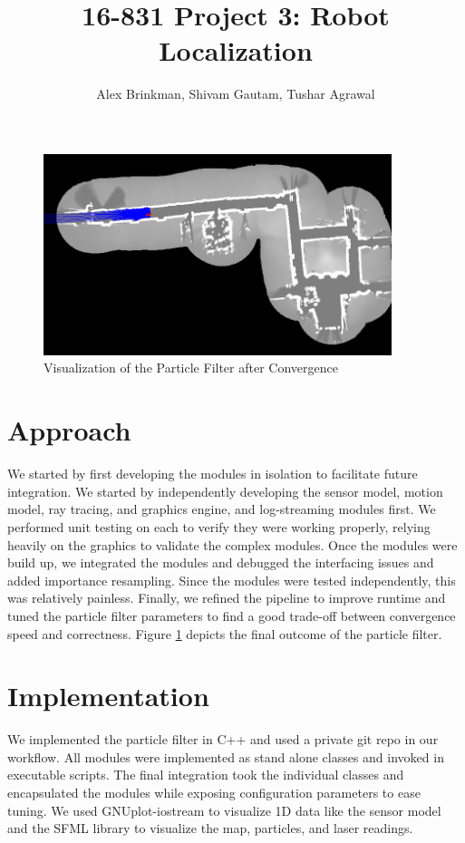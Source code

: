 \documentclass{article}
\begin{document}
\title{16-831 Project 3: Robot Localization}
\author{Alex Brinkman, Shivam Gautam, Tushar Agrawal}
\maketitle

\begin{figure}[!h]
    \centering
    \includegraphics[width=4.0in]{media/graphics_example.png}
    \caption{Visualization of the Particle Filter after Convergence}
\label{fig:1}
\end{figure}

\section{Approach}
	We started by first developing the modules in isolation to facilitate future integration. We started by independently developing the sensor model, motion model, ray tracing, and graphics engine, and log-streaming modules first. We performed unit testing on each to verify they were working properly, relying heavily on the graphics to validate the complex modules. Once the modules were build up, we integrated the modules and debugged the interfacing issues and added importance resampling. Since the modules were tested independently, this was relatively painless. Finally, we refined the pipeline to improve runtime and tuned the particle filter parameters to find a good trade-off between convergence speed and correctness. Figure \ref{fig:1} depicts the final outcome of the particle filter.

\section{Implementation}
	We implemented the particle filter in C++ and used a private git repo in our workflow.  All modules were implemented as stand alone classes and invoked in executable scripts.  The final integration took the individual classes and encapsulated the modules while exposing configuration parameters to ease tuning. We used GNUplot-iostream to visualize 1D data like the sensor model and the SFML library to visualize the map, particles, and laser readings.  
\end{document}
